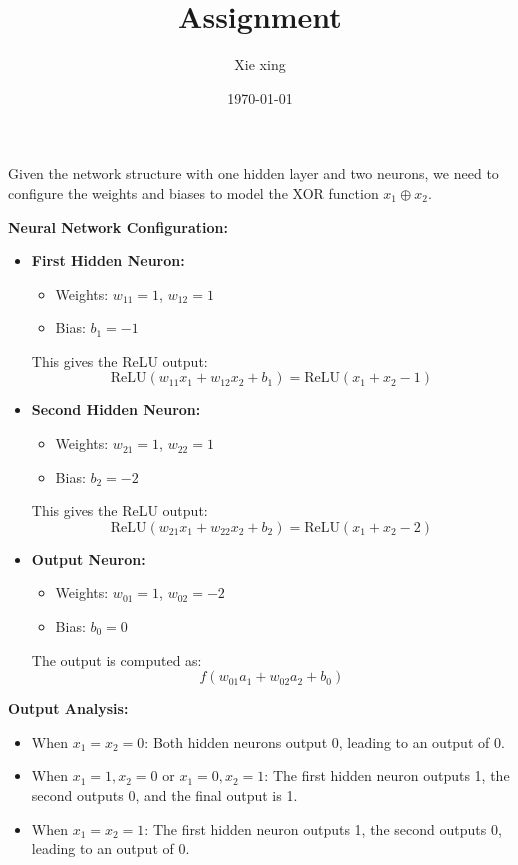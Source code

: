 \documentclass[oneside,solution]{seu-ml-assign}
\title{Assignment}
\author{Xie xing}
\date{\today}
\begin{document}
\maketitle


\subproblem{}
Given the network structure with one hidden layer and two neurons, we need to configure the weights 
and biases to model the XOR function $x_1 \oplus x_2$.

\textbf{Neural Network Configuration:}

\begin{itemize}
  \item \textbf{First Hidden Neuron:}
    \begin{itemize}
      \item Weights: $w_{11} = 1$, $w_{12} = 1$
      \item Bias: $b_1 = -1$
    \end{itemize}
    This gives the ReLU output:
    \[
    \text{ReLU}(w_{11}x_1 + w_{12}x_2 + b_1) = \text{ReLU}(x_1 + x_2 - 1)
    \]

  \item \textbf{Second Hidden Neuron:}
    \begin{itemize}
      \item Weights: $w_{21} = 1$, $w_{22} = 1$
      \item Bias: $b_2 = -2$
    \end{itemize}
    This gives the ReLU output:
    \[
    \text{ReLU}(w_{21}x_1 + w_{22}x_2 + b_2) = \text{ReLU}(x_1 + x_2 - 2)
    \]

  \item \textbf{Output Neuron:}
    \begin{itemize}
      \item Weights: $w_{01} = 1$, $w_{02} = -2$
      \item Bias: $b_0 = 0$
    \end{itemize}
    The output is computed as:
    \[
    f(w_{01}a_1 + w_{02}a_2 + b_0)
    \]
\end{itemize}

\textbf{Output Analysis:}
\begin{itemize}
  \item When $x_1 = x_2 = 0$: Both hidden neurons output 0, leading to an output of 0.
  \item When $x_1 = 1, x_2 = 0$ or $x_1 = 0, x_2 = 1$: The first hidden neuron outputs 1, the second outputs 0, and the final output is 1.
  \item When $x_1 = x_2 = 1$: The first hidden neuron outputs 1, the second outputs 0, leading to an output of 0.
\end{itemize}
\end{document}
